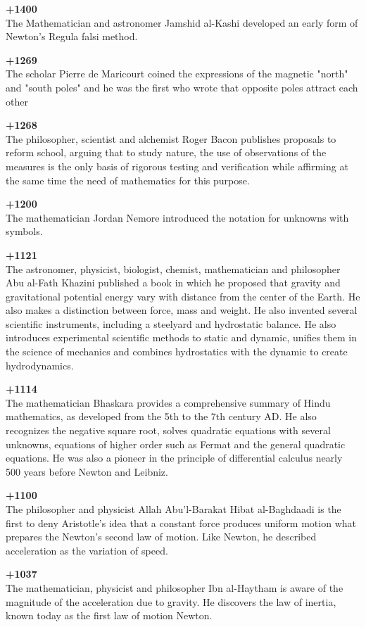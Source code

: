 \textbf{+1400}\\
The Mathematician and astronomer Jamshid al-Kashi developed an early form of Newton's Regula falsi method.

\textbf{+1269}\\
The scholar Pierre de Maricourt coined the expressions of the magnetic "north" and "south poles" and he was the first who wrote that opposite poles attract each other

\textbf{+1268}\\
The philosopher, scientist and alchemist Roger Bacon publishes proposals to reform school, arguing that to study nature, the use of observations of the measures is the only basis of rigorous testing and verification while affirming at the same time the need of mathematics for this purpose.

\textbf{+1200}\\
The mathematician Jordan Nemore introduced the notation for unknowns with symbols.

\textbf{+1121}\\
The astronomer, physicist, biologist, chemist, mathematician and philosopher Abu al-Fath Khazini published a book in which he proposed that gravity and gravitational potential energy vary with distance from the center of the Earth. He also makes a distinction between force, mass and weight. He also invented several scientific instruments, including a steelyard and hydrostatic balance. He also introduces experimental scientific methods to static and dynamic, unifies them in the science of mechanics and combines hydrostatics with the dynamic to create hydrodynamics.

\textbf{+1114}\\
The mathematician Bhaskara provides a comprehensive summary of Hindu mathematics, as developed from the 5th to the 7th century AD. He also recognizes the negative square root, solves quadratic equations with several unknowns, equations of higher order such as Fermat and the general quadratic equations. He was also a pioneer in the principle of differential calculus nearly 500 years before Newton and Leibniz.

\textbf{+1100}\\
The philosopher and physicist Allah Abu'l-Barakat Hibat al-Baghdaadi is the first to deny Aristotle's idea that a constant force produces uniform motion what prepares the Newton's second law of motion. Like Newton, he described acceleration as the variation of speed.

\textbf{+1037}\\
The mathematician, physicist and philosopher Ibn al-Haytham is aware of the magnitude of the acceleration due to gravity. He discovers the law of inertia, known today as the first law of motion Newton.

